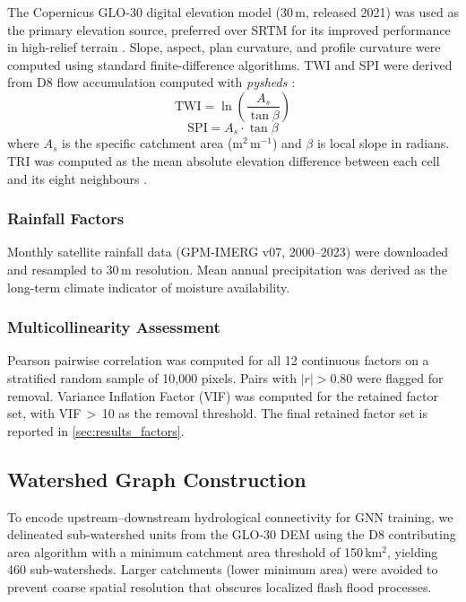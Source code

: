 The Copernicus GLO-30 digital elevation model (30\,m, released 2021) was
used as the primary elevation source, preferred over SRTM for its improved
performance in high-relief terrain \citep{fabdem2022}.
Slope, aspect, plan curvature, and profile curvature were computed using
standard finite-difference algorithms.
TWI and SPI were derived from D8 flow accumulation computed with \textit{pysheds}
\citep{pysheds2020}:
\begin{equation}
  \mathrm{TWI} = \ln\!\left(\frac{A_s}{\tan\beta}\right)
  \label{eq:twi}
\end{equation}
\begin{equation}
  \mathrm{SPI} = A_s \cdot \tan\beta
  \label{eq:spi}
\end{equation}
where $A_s$ is the specific catchment area (m$^2$\,m$^{-1}$) and
$\beta$ is local slope in radians.
TRI was computed as the mean absolute elevation difference between each cell
and its eight neighbours \citep{riley1999tri}.

\subsubsection{Rainfall Factors}
\label{sec:rainfall}

Monthly satellite rainfall data (GPM-IMERG v07, 2000--2023) were downloaded
and resampled to 30\,m resolution.
Mean annual precipitation was derived as the long-term climate indicator
of moisture availability.

\subsubsection{Multicollinearity Assessment}
\label{sec:multicollinearity}

Pearson pairwise correlation was computed for all 12 continuous factors
on a stratified random sample of 10,000 pixels.
Pairs with $|r| > 0.80$ were flagged for removal.
Variance Inflation Factor (VIF) was computed for the retained factor set,
with VIF\,$>$\,10 as the removal threshold.
The final retained factor set is reported in \cref{sec:results_factors}.

\subsection{Watershed Graph Construction}
\label{sec:graph}

To encode upstream--downstream hydrological connectivity for GNN training,
we delineated sub-watershed units from the GLO-30 DEM using the
D8 contributing area algorithm with a minimum catchment area threshold
of 150\,km$^2$, yielding 460 sub-watersheds.
Larger catchments (lower minimum area) were avoided to prevent
coarse spatial resolution that obscures localized flash flood processes.

